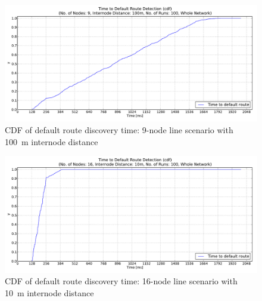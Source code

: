 \begin{figure}[htpb]
  \begin{center}
    \leavevmode
      \includegraphics[scale=0.38]
      {Pics/results/9/MRHOF/line/dist100_montecarlo_cdf_hist.pdf}
   \caption{CDF of default route discovery time: 9-node line scenario with 100~m internode distance}
   \label{fig:9_MRHOF_line100_cdf}
  \end{center}
\end{figure}


\begin{figure}[htpb]
  \begin{center}
    \leavevmode
      \includegraphics[scale=0.38]
      {Pics/results/16/MRHOF/line/dist10_montecarlo_cdf_hist.pdf}
   \caption{CDF of default route discovery time: 16-node line scenario with 10~m internode distance}
   \label{fig:16_MRHOF_line_10_cdf}
  \end{center}
\end{figure}


